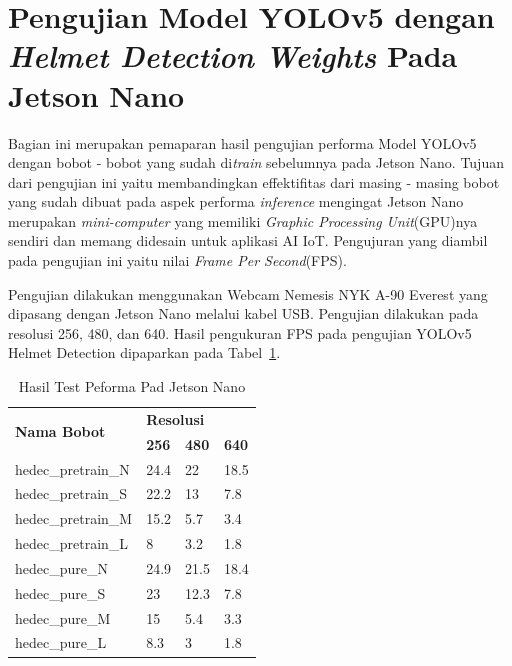 \section{Pengujian Model YOLOv5 dengan \emph{Helmet Detection Weights} Pada Jetson Nano}
\label{sec:jetsonnano_hedectest}

\par Bagian ini merupakan pemaparan hasil pengujian performa Model YOLOv5 dengan bobot - bobot yang sudah di\emph{train}
sebelumnya pada Jetson Nano. Tujuan dari pengujian ini yaitu membandingkan effektifitas dari masing - masing
bobot yang sudah dibuat pada aspek performa \emph{inference} mengingat Jetson Nano merupakan \emph{mini-computer} yang memiliki
\emph{Graphic Processing Unit}(GPU)nya sendiri dan memang didesain untuk aplikasi AI IoT. Pengujuran yang diambil pada pengujian ini
yaitu nilai \emph{Frame Per Second}(FPS).

 
\par Pengujian dilakukan menggunakan Webcam Nemesis NYK A-90 Everest yang dipasang dengan Jetson Nano melalui kabel USB. 
Pengujian dilakukan pada resolusi 256, 480, dan 640. Hasil pengukuran FPS pada pengujian YOLOv5 Helmet Detection dipaparkan pada Tabel~\ref{tb:jetsonanoperformancetest}.



\begin{longtable}{|l|l|l|l|} 
  \caption{Hasil Test Peforma Pad Jetson Nano}
  \label{tb:jetsonanoperformancetest}\\
  \hline
  \multirow{2}{*}{\textbf{Nama Bobot}} & \multicolumn{3}{l|}{\textbf{Resolusi}}      \\ 
  \cline{2-4}
                                       & \textbf{256} & \textbf{480} & \textbf{640}  \\ 
  \hline
  hedec\_pretrain\_N                   & 24.4         & 22           & 18.5          \\
  hedec\_pretrain\_S                   & 22.2         & 13           & 7.8           \\
  hedec\_pretrain\_M                   & 15.2         & 5.7          & 3.4           \\
  hedec\_pretrain\_L                   & 8            & 3.2          & 1.8           \\
  hedec\_pure\_N                       & 24.9         & 21.5         & 18.4          \\
  hedec\_pure\_S                       & 23           & 12.3         & 7.8           \\
  hedec\_pure\_M                       & 15           & 5.4          & 3.3           \\
  hedec\_pure\_L                       & 8.3          & 3            & 1.8           \\
  \hline
\end{longtable}

